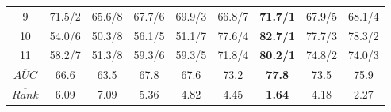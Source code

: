 \documentclass[review]{elsarticle}
\begin{document}
\begin{table}[h]
\begin{tabular}{|c|c|c|c|c|c|c|c|c|}
9 & 71.5/2 & 65.6/8 & 67.7/6 & 69.9/3 & 66.8/7 & \textbf{71.7/1} & 67.9/5 & 68.1/4 \\

10 & 54.0/6 & 50.3/8 & 56.1/5 & 51.1/7 & 77.6/4 & \textbf{82.7/1} & 77.7/3 & 78.3/2 \\

11 & 58.2/7 & 51.3/8 & 59.3/6 & 59.3/5 & 71.8/4 & \textbf{80.2/1} & 74.8/2 & 74.0/3 \\

\hline
$\overline{AUC}$ & 66.6	& 63.5 & 67.8 &	67.6 & 73.2 & \textbf{77.8} & 73.5 & 75.9 \\


$\overline{Rank}$ & 6.09 & 7.09 &  5.36 & 4.82 & 4.45 & \textbf{1.64} & 4.18 & 2.27 \\
 \hline 
\end{tabular}
\label{fig:cdnk-biogps}
\end{table}
\end{document}
